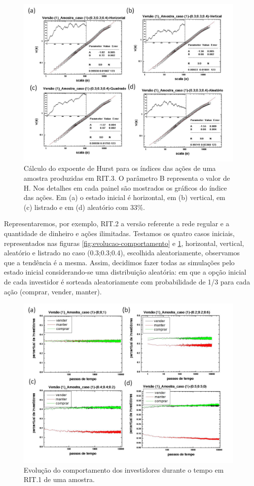 \documentclass[brazil,ruledheader]{abnt}
\begin{document}
\begin{figure}[!h]
\centering
\includegraphics[width=0.8\linewidth]{Figuras/2.jpg}
 \caption[ Cálculo do expoente de Hurst para os índices das ações em RI para 4
entradas diferentes]{Cálculo do expoente de Hurst para os índices das ações de
uma amostra produzidas em RIT.3. O parâmetro B representa o
valor de H. Nos detalhes em cada painel são mostrados os gráficos do índice
das ações. Em (a) o estado inicial é horizontal, em (b) vertical, em (c)
listrado e em (d) aleatório com 33\%.}
\label{fig:expoente-hurst}
\end{figure}

Representaremos, por exemplo, RIT.2 a versão referente a rede
regular e a quantidade de dinheiro e ações ilimitadas.  Testamos os quatro casos
iniciais, representados nas figuras
\ref{fig:evolucao-comportamento} e \ref{fig:expoente-hurst}, horizontal,
vertical, aleatório e listrado no caso (0.3;0.3;0.4), escolhida aleatoriamente,
observamos que a tendência é a mesma. Assim, decidimos fazer todas as simulações
pelo estado inicial considerando-se uma distribuição aleatória: em que a opção
inicial de cada investidor é sorteada aleatoriamente com probabilidade de 1/3
para cada ação (comprar, vender, manter).

\begin{figure}[!h]
\centering
\includegraphics[width=0.8\linewidth]{Figuras/3.jpg}
 \caption [Evolução do comportamento dos investidores em RIT.1]{Evolução do
comportamento dos investidores durante o tempo em RIT.1 de uma amostra. }
\label{fig:evolucao-comp-investidores}
\end{figure}
\end{document}
